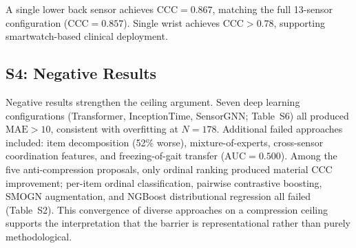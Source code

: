 \documentclass[11pt,a4paper]{article}
\newcommand{\tabnote}[1]{\par\vspace{2pt}\noindent\begin{minipage}{\linewidth}\small\itshape\raggedright #1\par\end{minipage}\par\vspace{0.4em}}
\begin{document}
\begin{table}[H]
\centering
\caption{\textbf{Table~S5.} Single-sensor ordinal ranking performance (T1 observable subscore, 5-fold CV).}
\label{tab:singlesensor}
%
\tabnote{A single lower back sensor achieves $\mathrm{CCC}=0.867$, matching the full 13-sensor configuration ($\mathrm{CCC}=0.857$). Single wrist achieves $\mathrm{CCC}>0.78$, supporting smartwatch-based clinical deployment.}
\end{table}

\subsection*{S4: Negative Results}

Negative results strengthen the ceiling argument. Seven deep learning configurations (Transformer, InceptionTime, SensorGNN; Table~S6) all produced $\mathrm{MAE}>10$, consistent with overfitting at $N=178$. Additional failed approaches included: item decomposition (52\% worse), mixture-of-experts, cross-sensor coordination features, and freezing-of-gait transfer ($\mathrm{AUC}=0.500$). Among the five anti-compression proposals, only ordinal ranking produced material CCC improvement; per-item ordinal classification, pairwise contrastive boosting, SMOGN augmentation, and NGBoost distributional regression all failed (Table~S2). This convergence of diverse approaches on a compression ceiling supports the interpretation that the barrier is representational rather than purely methodological.
\end{document}
